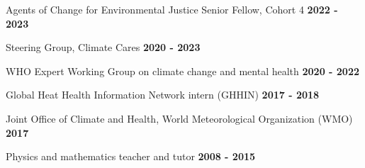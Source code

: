 \noindent Agents of Change for Environmental Justice Senior Fellow, Cohort 4 \hfill \textbf{2022 - 2023}

\noindent Steering Group, Climate Cares \hfill \textbf{2020 - 2023}

\noindent WHO Expert Working Group on climate change and mental health \hfill \textbf{2020 - 2022}

\noindent Global Heat Health Information Network intern (GHHIN) \hfill \textbf{2017 - 2018}

\noindent Joint Office of Climate and Health, World Meteorological Organization (WMO) \hfill \textbf{2017}

\noindent Physics and mathematics teacher and tutor \hfill \textbf{2008 - 2015}

